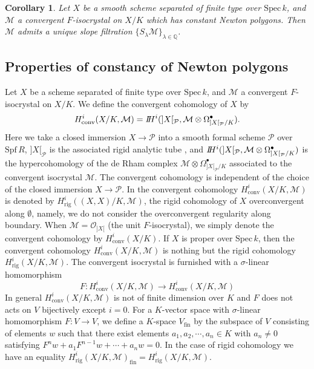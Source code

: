 \documentclass[11pt]{amsart}
\newtheorem{corollary}[Lemma]{Corollary}
\begin{document}
\begin{corollary}\label{sf} Let $X$ be a smooth scheme separated of finite type over $\mathrm{Spec}\, k$, 
and $\mathcal M$ a convergent $F$-isocrystal on $X/K$ which has constant Newton polygons. 
Then $\mathcal M$ admits a unique slope filtration $\{S_\lambda \mathcal M\}_{\lambda \in \mathbb Q}$. 
\end{corollary}

\subsection{Properties of constancy of Newton polygons}

Let $X$ be a scheme separated of finite type over $\mathrm{Spec}\, k$, 
and $\mathcal M$ a convergent $F$-isocrystal on $X/K$. 
We define the convergent cohomology of $X$ by 
$$
      H^i_{\mathrm{conv}}(X/K, \mathcal M) = I\hspace*{-1mm}H^i(]X[_{\mathcal P}, 
      \mathcal M \otimes \Omega_{]X[_{\mathcal P}/K}^\bullet).
$$
Here we take a closed immersion $X \rightarrow \mathcal P$ into 
a smooth formal scheme $\mathcal P$ over $\mathrm{Spf}\, R$,  
$]X[_{\mathcal P}$ is the associated rigid analytic tube \cite[Section 1.1]{Be}, 
and $I\hspace*{-1mm}H^i(]X[_{\mathcal P}, \mathcal M \otimes \Omega_{]X[_{\mathcal P}/K}^\bullet)$ is 
the hypercohomology of the de Rham complex $\mathcal M \otimes \Omega_{]X[_{\mathcal P}/K}^\bullet$ 
associated to the convergent isocrystal $\mathcal M$. 
The convergent cohomology is independent of the choice of the closed immersion $X \rightarrow \mathcal P$. 
In \cite{CT0} \cite{tsu} 
the convergent cohomology 
$H^i_{\mathrm{conv}}(X/K, \mathcal M)$ is denoted by $H^i_{\mathrm{rig}}((X, X)/K, \mathcal M)$, 
the rigid cohomology of $X$ overconvergent along $\emptyset$, namely, we do not consider the overconvergent 
regularity along boundary. 
When $\mathcal M = \mathcal O_{]X[}$ (the unit $F$-isocrystal), we simply denote 
the convergent cohomology by $H^i_{\mathrm{conv}}(X/K)$. 
If $X$ is proper over $\mathrm{Spec}\, k$, then the convergent cohomology $H^i_{\mathrm{conv}}(X/K, \mathcal M)$ 
is nothing but the rigid cohomology $H^i_{\mathrm{rig}}(X/K, \mathcal M)$. 
The convergent isocrystal is furnished with a $\sigma$-linear homomorphism 
$$
        F : H^i_{\mathrm{conv}}(X/K, \mathcal M) \rightarrow H^i_{\mathrm{conv}}(X/K, \mathcal M)
$$
In general $H^i_{\mathrm{conv}}(X/K, \mathcal M)$ 
is not of finite dimension over $K$ and $F$ does not acts on $V$ bijectively except $i = 0$. 
For a $K$-vector space with $\sigma$-linear homomorphism  
$F : V \rightarrow V$, we define a $K$-space $V_{\mathrm{fin}}$ by the subspace of 
$V$ consisting of elements $w$ 
such that there exist elements $a_1, a_2, \cdots, a_n \in K$ with $a_n \ne 0$ 
satisfying $F^nw + a_1F^{n-1}w + \cdots + a_nw = 0$. In the case of rigid cohomology 
we have an equality $H^i_{\mathrm{rig}}(X/K, \mathcal M)_{\mathrm{fin}} = 
H^i_{\mathrm{rig}}(X/K, \mathcal M)$. 
\end{document}
